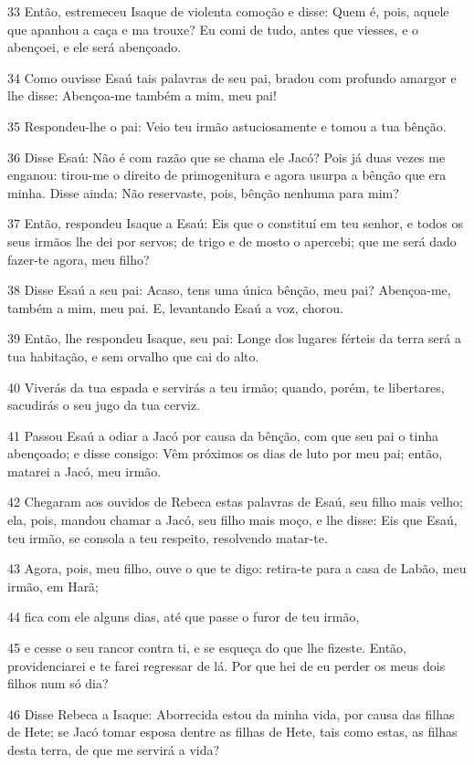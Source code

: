 \par 33 Então, estremeceu Isaque de violenta comoção e disse: Quem é, pois, aquele que apanhou a caça e ma trouxe? Eu comi de tudo, antes que viesses, e o abençoei, e ele será abençoado.
\par 34 Como ouvisse Esaú tais palavras de seu pai, bradou com profundo amargor e lhe disse: Abençoa-me também a mim, meu pai!
\par 35 Respondeu-lhe o pai: Veio teu irmão astuciosamente e tomou a tua bênção.
\par 36 Disse Esaú: Não é com razão que se chama ele Jacó? Pois já duas vezes me enganou: tirou-me o direito de primogenitura e agora usurpa a bênção que era minha. Disse ainda: Não reservaste, pois, bênção nenhuma para mim?
\par 37 Então, respondeu Isaque a Esaú: Eis que o constituí em teu senhor, e todos os seus irmãos lhe dei por servos; de trigo e de mosto o apercebi; que me será dado fazer-te agora, meu filho?
\par 38 Disse Esaú a seu pai: Acaso, tens uma única bênção, meu pai? Abençoa-me, também a mim, meu pai. E, levantando Esaú a voz, chorou.
\par 39 Então, lhe respondeu Isaque, seu pai: Longe dos lugares férteis da terra será a tua habitação, e sem orvalho que cai do alto.
\par 40 Viverás da tua espada e servirás a teu irmão; quando, porém, te libertares, sacudirás o seu jugo da tua cerviz.
\par 41 Passou Esaú a odiar a Jacó por causa da bênção, com que seu pai o tinha abençoado; e disse consigo: Vêm próximos os dias de luto por meu pai; então, matarei a Jacó, meu irmão.
\par 42 Chegaram aos ouvidos de Rebeca estas palavras de Esaú, seu filho mais velho; ela, pois, mandou chamar a Jacó, seu filho mais moço, e lhe disse: Eis que Esaú, teu irmão, se consola a teu respeito, resolvendo matar-te.
\par 43 Agora, pois, meu filho, ouve o que te digo: retira-te para a casa de Labão, meu irmão, em Harã;
\par 44 fica com ele alguns dias, até que passe o furor de teu irmão,
\par 45 e cesse o seu rancor contra ti, e se esqueça do que lhe fizeste. Então, providenciarei e te farei regressar de lá. Por que hei de eu perder os meus dois filhos num só dia?
\par 46 Disse Rebeca a Isaque: Aborrecida estou da minha vida, por causa das filhas de Hete; se Jacó tomar esposa dentre as filhas de Hete, tais como estas, as filhas desta terra, de que me servirá a vida?

